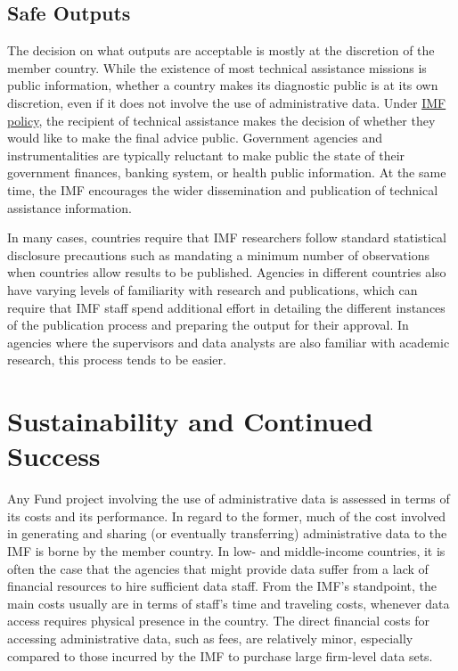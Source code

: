 \hypertarget{safe-outputs-7}{%
\subsection{Safe Outputs}\label{safe-outputs-7}}

The decision on what outputs are acceptable is mostly at the discretion of the member country. While the existence of most technical assistance missions is public information, whether a country makes its diagnostic public is at its own discretion, even if it does not involve the use of administrative data. Under \href{https://www.imf.org/external/np/pp/eng/2013/061013.pdf}{IMF policy}, the recipient of technical assistance makes the decision of whether they would like to make the final advice public. Government agencies and instrumentalities are typically reluctant to make public the state of their government finances, banking system, or health public information. At the same time, the IMF encourages the wider dissemination and publication of technical assistance information.

In many cases, countries require that IMF researchers follow standard statistical disclosure precautions such as mandating a minimum number of observations when countries allow results to be published. Agencies in different countries also have varying levels of familiarity with research and publications, which can require that IMF staff spend additional effort in detailing the different instances of the publication process and preparing the output for their approval. In agencies where the supervisors and data analysts are also familiar with academic research, this process tends to be easier.

\hypertarget{sustainability-and-continued-success-7}{%
\section{Sustainability and Continued Success}\label{sustainability-and-continued-success-7}}

Any Fund project involving the use of administrative data is assessed in terms of its costs and its performance. In regard to the former, much of the cost involved in generating and sharing (or eventually transferring) administrative data to the IMF is borne by the member country. In low- and middle-income countries, it is often the case that the agencies that might provide data suffer from a lack of financial resources to hire sufficient data staff. From the IMF's standpoint, the main costs usually are in terms of staff's time and traveling costs, whenever data access requires physical presence in the country. The direct financial costs for accessing administrative data, such as fees, are relatively minor, especially compared to those incurred by the IMF to purchase large firm-level data sets.

